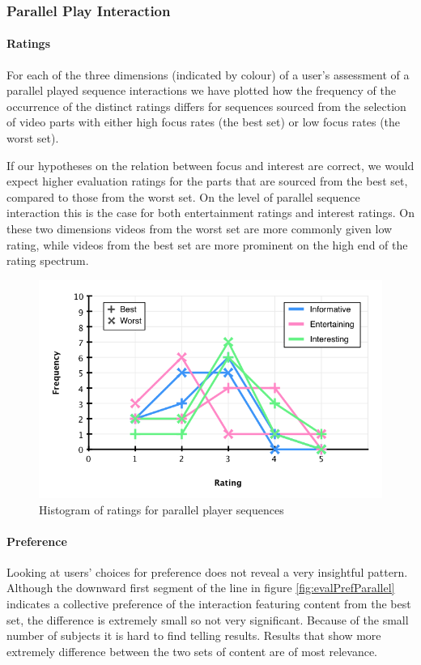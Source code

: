\subsubsection{Parallel Play Interaction}
\paragraph{Ratings}

For each of the three dimensions (indicated by colour) of a user's assessment of a parallel played sequence interactions we have plotted how the frequency of the occurrence of the distinct ratings differs for sequences sourced from the selection of video parts with either high focus rates (the best set) or low focus rates (the worst set).

If our hypotheses on the relation between focus and interest are correct, we would expect higher evaluation ratings for the parts that are sourced from the best set, compared to those from the worst set. On the level of parallel sequence interaction this is the case for both entertainment ratings and interest ratings. On these two dimensions videos from the worst set are more commonly given low rating, while videos from the best set are more prominent on the high end of the rating spectrum.

\begin{figure}[htbp]
  \centering
    \includegraphics[width=.6\textwidth]{img/evaluation/hist_parallel_key}
  \caption{Histogram of ratings for parallel player sequences}
  \label{fig:evalParallel}
\end{figure}

\paragraph{Preference}
Looking at users' choices for preference does not reveal a very insightful pattern. Although the downward first segment of the line in figure \ref{fig:evalPrefParallel} indicates a collective preference of the interaction featuring content from the best set, the difference is extremely small so not very significant. Because of the small number of subjects it is hard to find telling results. Results that show more extremely difference between the two sets of content are of most relevance.

